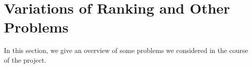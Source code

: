 \section{Variations of Ranking and Other Problems}

In this section, we give an overview of some problems we considered in the
course of the project. 
